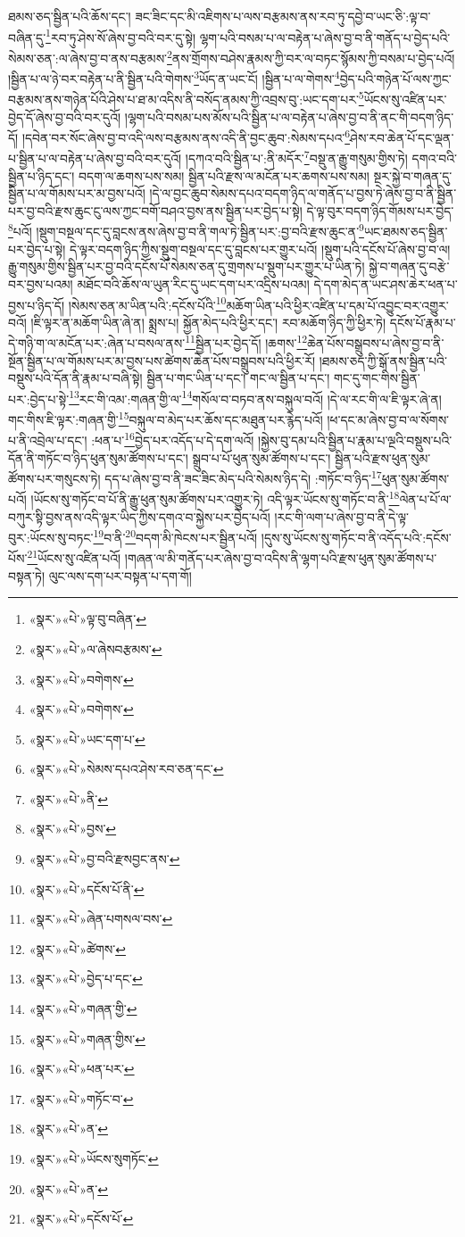 ཐམས་ཅད་སྦྱིན་པའི་ཆོས་དང་། ཟང་ཟིང་དང་མི་འཇིགས་པ་ལས་བརྩམས་ནས་རབ་ཏུ་དབྱེ་བ་ཡང་ཅི་:ལྟ་བ་བཞིན་དུ་\footnote{«སྣར་»«པེ་»ལྟ་བུ་བཞིན་}རབ་ཏུ་ཤེས་སོ་ཞེས་བྱ་བའི་བར་དུ་སྟེ། ལྷག་པའི་བསམ་པ་ལ་བརྟེན་པ་ཞེས་བྱ་བ་ནི་གནོད་པ་བྱེད་པའི་སེམས་ཅན་:ལ་ཞེས་བྱ་བ་ནས་བརྩམས་\footnote{«སྣར་»«པེ་»ལ་ཞེསབརྩམས་}ནས་གྲོགས་བཤེས་རྣམས་ཀྱི་བར་ལ་བཏང་སྙོམས་ཀྱི་བསམ་པ་བྱེད་པའོ། །སྦྱིན་པ་ལ་ཉེ་བར་བརྟེན་པ་ནི་སྦྱིན་པའི་གེགས་\footnote{«སྣར་»«པེ་»བགེགས་}ཡོད་ན་ཡང་ངོ། །སྦྱིན་པ་ལ་གེགས་\footnote{«སྣར་»«པེ་»བགེགས་}བྱེད་པའི་གཉེན་པོ་ལས་ཀྱང་བརྩམས་ནས་གཉེན་པོའི་ཤེས་པ་ཐ་མ་འདིས་ནི་བསོད་ནམས་ཀྱི་འབྲས་བུ་:ཡང་དག་པར་\footnote{«སྣར་»«པེ་»ཡང་དག་པ་}ཡོངས་སུ་འཛིན་པར་བྱེད་དོ་ཞེས་བྱ་བའི་བར་དུའོ། །ལྷག་པའི་བསམ་པས་མོས་པའི་སྦྱིན་པ་ལ་བརྟེན་པ་ཞེས་བྱ་བ་ནི་ནང་གི་བདག་ཉིད་དོ། །དབེན་བར་སོང་ཞེས་བྱ་བ་འདི་ལས་བརྩམས་ནས་འདི་ནི་བྱང་ཆུབ་:སེམས་དཔའ་\footnote{«སྣར་»«པེ་»སེམས་དཔའ་ཤེས་རབ་ཅན་དང་}ཤེས་རབ་ཆེན་པོ་དང་ལྡན་པ་སྦྱིན་པ་ལ་བརྟེན་པ་ཞེས་བྱ་བའི་བར་དུའོ། །དཀའ་བའི་སྦྱིན་པ་:ནི་མདོར་\footnote{«སྣར་»«པེ་»ནི་}བསྡུ་ན་རྒྱུ་གསུམ་གྱིས་ཏེ། དགའ་བའི་སྦྱིན་པ་ཉིད་དང་། བདག་ལ་ཆགས་པས་སམ། སྦྱིན་པའི་རྫས་ལ་མངོན་པར་ཆགས་པས་སམ། སྔར་སྐྱེ་བ་གཞན་དུ་སྦྱིན་པ་ལ་གོམས་པར་མ་བྱས་པའོ། །དེ་ལ་བྱང་ཆུབ་སེམས་དཔའ་བདག་ཉིད་ལ་གནོད་པ་བྱས་ཏེ་ཞེས་བྱ་བ་ནི་སྦྱིན་པར་བྱ་བའི་རྫས་ཆུང་ངུ་ལས་ཀྱང་བགོ་བཤའ་བྱས་ནས་སྦྱིན་པར་བྱེད་པ་སྟེ། དེ་ལྟ་བུར་བདག་ཉིད་གོམས་པར་བྱེད་\footnote{«སྣར་»«པེ་»བྱས་}པའོ། །སྡུག་བསྔལ་དང་དུ་བླངས་ནས་ཞེས་བྱ་བ་ནི་གལ་ཏེ་སྦྱིན་པར་:བྱ་བའི་རྫས་ཆུང་ན་\footnote{«སྣར་»«པེ་»བྱ་བའི་རྫསབྱང་ནས་}ཡང་ཐམས་ཅད་སྦྱིན་པར་བྱེད་པ་སྟེ། དེ་ལྟར་བདག་ཉིད་ཀྱིས་སྡུག་བསྔལ་དང་དུ་བླངས་པར་གྱུར་པའོ། །སྡུག་པའི་དངོས་པོ་ཞེས་བྱ་བ་ལ། རྒྱུ་གསུམ་གྱིས་སྦྱིན་པར་བྱ་བའི་དངོས་པོ་སེམས་ཅན་དུ་གྲགས་པ་སྡུག་པར་གྱུར་པ་ཡིན་ཏེ། སྐྱེ་བ་གཞན་དུ་བརྩེ་བར་བྱས་པའམ། མཐོང་བའི་ཆོས་ལ་ཡུན་རིང་དུ་ཡང་དག་པར་འདྲིས་པའམ། དེ་དག་མེད་ན་ཡང་ཤས་ཆེར་ཕན་པ་བྱས་པ་ཉིད་དོ། །སེམས་ཅན་མ་ཡིན་པའི་:དངོས་པོའི་\footnote{«སྣར་»«པེ་»དངོས་པོ་ནི་}མཆོག་ཡིན་པའི་ཕྱིར་འཛིན་པ་དམ་པོ་འབྱུང་བར་འགྱུར་བའོ། །ཇི་ལྟར་ན་མཆོག་ཡིན་ཞེ་ན། སྨྲས་པ། སྐྱོན་མེད་པའི་ཕྱིར་དང་། རབ་མཆོག་ཉིད་ཀྱི་ཕྱིར་ཏེ། དངོས་པོ་རྣམ་པ་དེ་གཉི་ག་ལ་མངོན་པར་:ཞེན་པ་བསལ་ནས་\footnote{«སྣར་»«པེ་»ཞེན་པགསལ་བས་}སྦྱིན་པར་བྱེད་དོ། །ཆགས་\footnote{«སྣར་»«པེ་»ཚེགས་}ཆེན་པོས་བསྒྲུབས་པ་ཞེས་བྱ་བ་ནི་སྔོན་སྦྱིན་པ་ལ་གོམས་པར་མ་བྱས་པས་ཚེགས་ཆེན་པོས་བསྒྲུབས་པའི་ཕྱིར་རོ། །ཐམས་ཅད་ཀྱི་སྒོ་ནས་སྦྱིན་པའི་བསྡུས་པའི་དོན་ནི་རྣམ་པ་བཞི་སྟེ། སྦྱིན་པ་གང་ཡིན་པ་དང་། གང་ལ་སྦྱིན་པ་དང་། གང་དུ་གང་གིས་སྦྱིན་པར་:བྱེད་པ་སྟེ་\footnote{«སྣར་»«པེ་»བྱེད་པ་དང་}རང་གི་འམ་:གཞན་གྱི་ལ་\footnote{«སྣར་»«པེ་»གཞན་གྱི་}གསོལ་བ་བཏབ་ནས་བསྐུལ་བའོ། །དེ་ལ་རང་གི་ལ་ཇི་ལྟར་ཞེ་ན། གང་གིས་ཇི་ལྟར་:གཞན་གྱི་\footnote{«སྣར་»«པེ་»གཞན་གྱིས་}བསྐུལ་བ་མེད་པར་ཆོས་དང་མཐུན་པར་རྙེད་པའོ། །ཕ་དང་མ་ཞེས་བྱ་བ་ལ་སོགས་པ་ནི་འབྲེལ་པ་དང་། :ཕན་པ་\footnote{«སྣར་»«པེ་»ཕན་པར་}བྱེད་པར་འདོད་པ་དེ་དག་ལའོ། །སྐྱེས་བུ་དམ་པའི་སྦྱིན་པ་རྣམ་པ་ལྔའི་བསྡུས་པའི་དོན་ནི་གཏོང་བ་ཉིད་ཕུན་སུམ་ཚོགས་པ་དང་། སྒྲུབ་པ་པོ་ཕུན་སུམ་ཚོགས་པ་དང་། སྦྱིན་པའི་རྫས་ཕུན་སུམ་ཚོགས་པར་གསུངས་ཏེ། དད་པ་ཞེས་བྱ་བ་ནི་ཟང་ཟིང་མེད་པའི་སེམས་ཉིད་དེ། :གཏོང་བ་ཉིད་\footnote{«སྣར་»«པེ་»གཏོང་བ་}ཕུན་སུམ་ཚོགས་པའོ། །ཡོངས་སུ་གཏོང་བ་པོ་ནི་རྒྱུ་ཕུན་སུམ་ཚོགས་པར་འགྱུར་ཏེ། འདི་ལྟར་ཡོངས་སུ་གཏོང་བ་ནི་\footnote{«སྣར་»«པེ་»ན་}ལེན་པ་པོ་ལ་བཀུར་སྟི་བྱས་ནས་འདི་ལྟར་ཡིད་ཀྱིས་དགའ་བ་སྐྱེས་པར་བྱེད་པའོ། །རང་གི་ལག་པ་ཞེས་བྱ་བ་ནི་དེ་ལྟ་བུར་:ཡོངས་སུ་བཏང་\footnote{«སྣར་»«པེ་»ཡོངས་སུགཏོང་}བ་ནི་\footnote{«སྣར་»«པེ་»ན་}བདག་མི་ཁེངས་པར་སྦྱིན་པའོ། །དུས་སུ་ཡོངས་སུ་གཏོང་བ་ནི་འདོད་པའི་:དངོས་པོས་\footnote{«སྣར་»«པེ་»དངོས་པོ་}ཡོངས་སུ་འཛིན་པའོ། །གཞན་ལ་མི་གནོད་པར་ཞེས་བྱ་བ་འདིས་ནི་ལྷག་པའི་རྫས་ཕུན་སུམ་ཚོགས་པ་བསྟན་ཏེ། ལུང་ལས་དག་པར་བསྟན་པ་དག་གོ། 